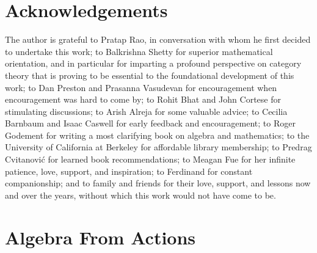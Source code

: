 \documentclass[pra,twocolumn,groupedaddress,10pt]{revtex4}
\theoremstyle{definition}
\begin{document}
\section{Acknowledgements} \label{sec:acknowledgements}

The author is grateful to Pratap Rao, in conversation with whom he first decided to undertake this work; to Balkrishna Shetty\cite{shetty} for superior mathematical orientation, and in particular for imparting a profound perspective on category theory that is proving to be essential to the foundational development of this work; to Dan Preston and Prasanna Vasudevan for encouragement when encouragement was hard to come by; to Rohit Bhat and John Cortese for stimulating discussions; to Arish Alreja for some valuable advice; to Cecilia Barnbaum and Isaac Caswell for early feedback and encouragement; to Roger Godement for writing a most clarifying book\cite{godement} on algebra and mathematics; to the University of California at Berkeley for affordable library membership; to Predrag Cvitanovi\'{c} for learned book recommendations; to Meagan Fue for her infinite patience, love, support, and inspiration; to Ferdinand for constant companionship; and to family and friends for their love, support, and lessons now and over the years, without which this work would not have come to be.




\appendix

\section{Algebra From Actions} \label{app:algact}
\end{document}
